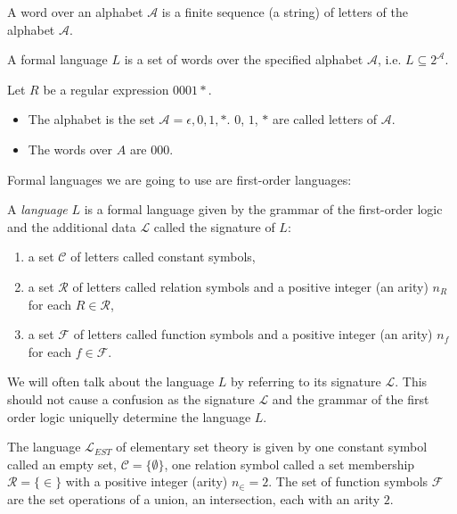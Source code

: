 \begin{defn}
A word over an alphabet $\mathcal{A}$ is a finite sequence (a string) of letters of the alphabet $\mathcal{A}$.
\end{defn}

\begin{defn}
A formal language $L$ is a set of words over the specified alphabet $\mathcal{A}$, i.e. $L \subseteq 2^\mathcal{A}$.
\end{defn}

\begin{exmp}
Let $R$ be a regular expression $0001*$.
\begin{itemize}
\item The alphabet is the set $\mathcal{A}={\epsilon, 0,1,*}$. $0$, $1$, $*$ are called letters of $\mathcal{A}$.
\item The words over $A$ are $000$.
\end{itemize}
\end{exmp}

Formal languages we are going to use are first-order languages:
\begin{defn}
A \emph{language} $L$ is a formal language given by the grammar of the first-order logic and the additional data $\mathcal{L}$ called the signature of $L$:
\begin{enumerate}
\item a set $\mathcal{C}$ of letters called constant symbols,
\item a set $\mathcal{R}$ of letters called relation symbols and a positive integer (an arity) $n_R$ for each $R \in \mathcal{R}$,
\item a set $\mathcal{F}$ of letters called function symbols and a positive integer (an arity) $n_f$ for each $f \in \mathcal{F}$.
\end{enumerate}
\end{defn}

\begin{remark}
We will often talk about the language $L$ by referring to its signature $\mathcal{L}$. This should not cause a confusion as the signature $\mathcal{L}$ and the grammar of the first order logic uniquelly determine the language $L$.
\end{remark}

\begin{exmp}
The language $\mathcal{L}_{EST}$ of elementary set theory is given by one constant symbol called an empty set, $\mathcal{C}=\{\emptyset\}$, one relation symbol called a set membership $\mathcal{R}=\{\in\}$ with a positive integer (arity) $n_{\in}=2$. The set of function symbols $\mathcal{F}$ are the set operations of a union, an intersection, each with an arity $2$.
\end{exmp}

